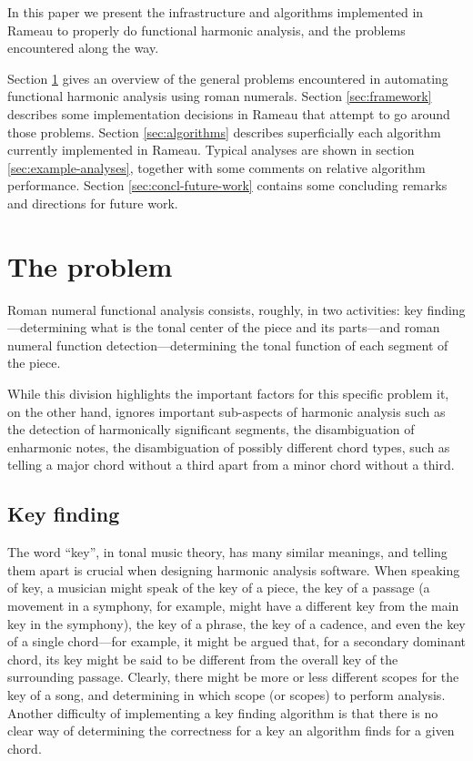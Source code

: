 In this paper we present the infrastructure and algorithms implemented
in Rameau to properly do functional harmonic analysis, and the
problems encountered along the way.

Section \ref{sec:problem} gives an overview of the general problems
encountered in automating functional harmonic analysis using roman
numerals. Section \ref{sec:framework} describes some implementation
decisions in Rameau that attempt to go around those problems. Section
\ref{sec:algorithms} describes superficially each algorithm currently
implemented in Rameau. Typical analyses are shown in section
\ref{sec:example-analyses}, together with some comments on relative
algorithm performance. Section \ref{sec:concl-future-work} contains
some concluding remarks and directions for future work.

\section{The problem}
\label{sec:problem}

Roman numeral functional analysis consists, roughly, in two
activities: key finding---determining what is the tonal center of the
piece and its parts---and roman numeral function
detection---determining the tonal function of each segment of the piece. 

While this division highlights the important factors for this specific
problem it, on the other hand, ignores important sub-aspects of
harmonic analysis such as the detection of harmonically significant
segments, the disambiguation of enharmonic notes, the disambiguation
of possibly different chord types, such as telling a major chord
without a third apart from a minor chord without a third.

\subsection{Key finding}
\label{sec:key-finding}

The word ``key'', in tonal music theory, has many similar meanings,
and telling them apart is crucial when designing harmonic analysis
software. When speaking of key, a musician might speak of the key of a
piece, the key of a passage (a movement in a symphony, for example,
might have a different key from the main key in the symphony), the key
of a phrase, the key of a cadence, and even the key of a single
chord---for example, it might be argued that, for a secondary dominant
chord, its key might be said to be different from the overall key of
the surrounding passage. Clearly, there might be more or less
different scopes for the key of a song, and determining in which scope
(or scopes) to perform analysis. Another difficulty of implementing a
key finding algorithm is that there is no clear way of determining the
correctness for a key an algorithm finds for a given chord.

